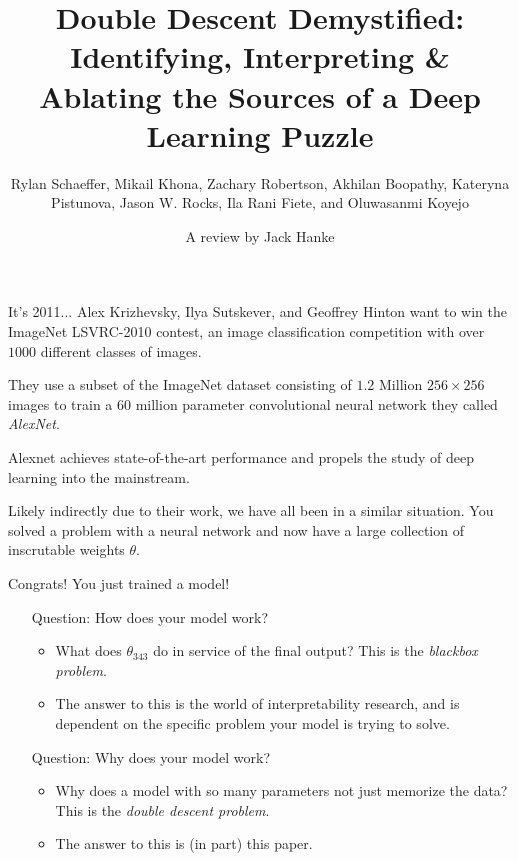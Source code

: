\documentclass{beamer}
\title[Double Descent Demystified]{Double Descent Demystified: Identifying, Interpreting \& Ablating the Sources of a Deep Learning Puzzle}
\subtitle[Rylan Schaeffer, ]{Rylan Schaeffer, Mikail Khona, Zachary Robertson, Akhilan Boopathy, Kateryna Pistunova, Jason W. Rocks, Ila Rani Fiete, and Oluwasanmi Koyejo}
\author{A review by Jack Hanke}
\begin{document}
\usetikzlibrary{calc}

\usebackgroundtemplate{}


\begin{frame}
    \titlepage
\end{frame}


\begin{frame}{It's 2011...}
    Alex Krizhevsky, Ilya Sutskever, and Geoffrey Hinton want to win the ImageNet LSVRC-2010 contest, an image classification competition with over $1000$ different classes of images. 

    \hspace{3cm}
    \pause
    
    They use a subset of the ImageNet dataset consisting of $1.2$ Million $256 \times 256$ images to train a $60$ million parameter convolutional neural network they called \emph{AlexNet}.

    \hspace{3cm}
    \pause
    
    Alexnet achieves state-of-the-art performance and propels the study of deep learning into the mainstream. 

    \hspace{3cm}
    \pause
    
    Likely indirectly due to their work, we have all been in a similar situation. You solved a problem with a neural network and now have a large collection of inscrutable weights $\theta$.
     
\end{frame}

\begin{frame}{Congrats! You just trained a model!}
\pause
\begin{center}
\begin{enumerate}
\item[Question:] How does your model work?
\pause
\begin{itemize}
    \item What does $\theta_{343}$ do in service of the final output? This is the \emph{blackbox problem}.
    \pause
    \item The answer to this is the world of interpretability research, and is dependent on the specific problem your model is trying to solve. 
    \pause
\end{itemize}
\item[Question:] Why does your model work?
\pause
\begin{itemize}
    \item Why does a model with so many parameters not just memorize the data? This is the \emph{double descent problem}.
    \pause
    \item The answer to this is (in part) this paper. 
\end{itemize}
\end{enumerate}
\end{center}

\end{frame}
\end{document}

